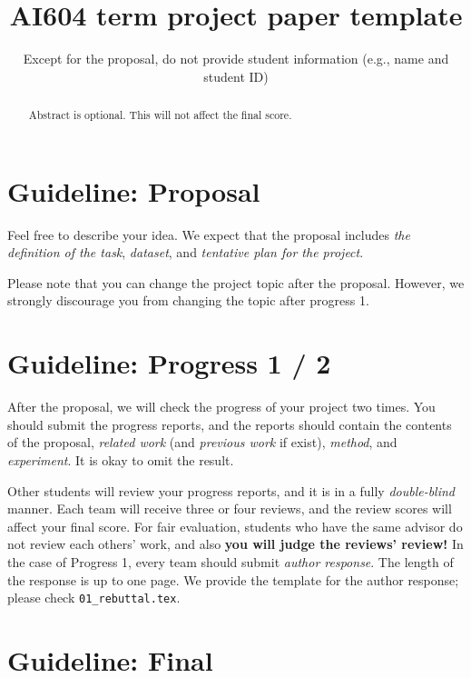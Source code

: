 \documentclass[final]{cvpr}
\begin{document}
\title{AI604 term project paper template}

\author{Except for the proposal, do not provide student information (e.g., name and student ID)
}

\maketitle


\begin{abstract}
Abstract is optional. This will not affect the final score.
\end{abstract}

\section{Guideline: Proposal}

Feel free to describe your idea. We expect that the proposal includes \textit{the definition of the task}, \textit{dataset}, and \textit{tentative plan for the project}.

Please note that you can change the project topic after the proposal. However, we strongly discourage you from changing the topic after progress 1.

\section{Guideline: Progress 1 / 2}

After the proposal, we will check the progress of your project two times. You should submit the progress reports, and the reports should contain the contents of the proposal, \textit{related work} (and \textit{previous work} if exist), \textit{method}, and \textit{experiment}. It is okay to omit the result.

Other students will review your progress reports, and it is in a fully \textit{double-blind} manner. Each team will receive three or four reviews, and the review scores will affect your final score. For fair evaluation, students who have the same advisor do not review each others' work, and also \textbf{you will judge the reviews' review!} In the case of Progress 1, every team should submit \textit{author response}. The length of the response is up to one page. We provide the template for the author response; please check \texttt{01\_rebuttal.tex}.

\section{Guideline: Final}
\end{document}
